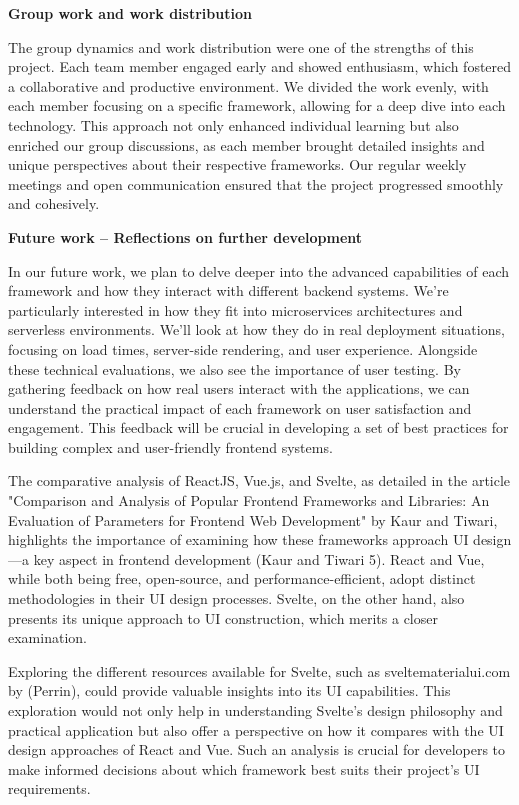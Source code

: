 \textbf{Group work and work distribution}

The group dynamics and work distribution were one of the strengths of this project. Each team member engaged early and showed enthusiasm, which fostered a collaborative and productive environment. We divided the work evenly, with each member focusing on a specific framework, allowing for a deep dive into each technology. This approach not only enhanced individual learning but also enriched our group discussions, as each member brought detailed insights and unique perspectives about their respective frameworks. Our regular weekly meetings and open communication ensured that the project progressed smoothly and cohesively.

\textbf{Future work – Reflections on further development}

In our future work, we plan to delve deeper into the advanced capabilities of each framework and how they interact with different backend systems. We're particularly interested in how they fit into microservices architectures and serverless environments. We'll look at how they do in real deployment situations, focusing on load times, server-side rendering, and user experience. Alongside these technical evaluations, we also see the importance of user testing. By gathering feedback on how real users interact with the applications, we can understand the practical impact of each framework on user satisfaction and engagement. This feedback will be crucial in developing a set of best practices for building complex and user-friendly frontend systems.


The comparative analysis of ReactJS, Vue.js, and Svelte, as detailed in the article "Comparison and Analysis of Popular Frontend Frameworks and Libraries: An Evaluation of Parameters for Frontend Web Development" by Kaur and Tiwari, highlights the importance of examining how these frameworks approach UI design—a key aspect in frontend development (Kaur and Tiwari 5). React and Vue, while both being free, open-source, and performance-efficient, adopt distinct methodologies in their UI design processes. Svelte, on the other hand, also presents its unique approach to UI construction, which merits a closer examination.

Exploring the different resources available for Svelte, such as sveltematerialui.com by (Perrin), could provide valuable insights into its UI capabilities. This exploration would not only help in understanding Svelte’s design philosophy and practical application but also offer a perspective on how it compares with the UI design approaches of React and Vue. Such an analysis is crucial for developers to make informed decisions about which framework best suits their project's UI requirements.
